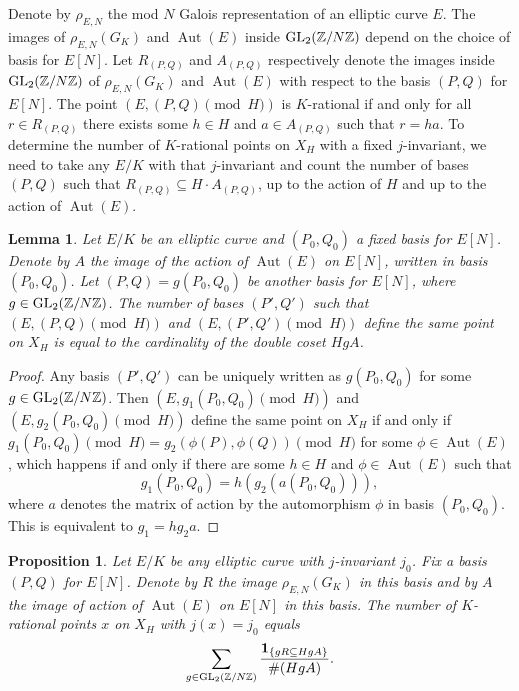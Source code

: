 \documentclass[10pt,leqno]{amsart}
\newcommand{\Z}{\mathbb{Z}}
\newcommand{\GL}{\textnormal{GL}}
\DeclareMathOperator{\Aut}{Aut}
\newtheorem{lemma}[theorem]{Lemma}
\newtheorem{proposition}[theorem]{Proposition}
\theoremstyle{definition}
\theoremstyle{remark}
\numberwithin{theorem}{section}
\begin{document}
Denote by $\rho_{E,N}$ the mod $N$ Galois representation of an elliptic curve $E$. The images of $\rho_{E,N}(G_K)$ and $\Aut(E)$ inside $\GL_2(\Z/N\Z)$ depend on the choice of basis for $E[N]$. Let $R_{(P,Q)}$ and $A_{(P,Q)}$ respectively denote the images inside $\GL_2(\Z/N\Z)$ of $\rho_{E,N}(G_K)$ and $\Aut(E)$ with respect to the basis $(P,Q)$ for $E[N]$. The point $(E, (P,Q) \pmod H)$ is $K$-rational if and only for all $r \in R_{(P,Q)}$ there exists some $h\in H$ and $a \in A_{(P,Q)}$ such that $r=ha$. To determine the number of $K$-rational points on $X_H$ with a fixed $j$-invariant, we need to take any $E/K$ with that $j$-invariant and count the number of bases $(P,Q)$ such that $R_{(P,Q)}\subseteq H\cdot A_{(P,Q)}$, up to the action of $H$ and up to the action of $\Aut(E)$. 

\begin{lemma}\label{broj baza}
    Let $E/K$ be an elliptic curve and $(P_0,Q_0)$ a fixed basis for $E[N]$. Denote by $A$ the image of the action of $\Aut(E)$ on $E[N]$, written in basis $(P_0,Q_0)$. Let $(P,Q)=g(P_0, Q_0)$ be another basis for $E[N]$, where $g \in \GL_2(\Z/N\Z)$. The number of bases $(P', Q')$ such that $(E, (P,Q) \pmod H)$  and $(E, (P', Q') \pmod H)$ define the same point  on $X_H$ is equal to the cardinality of the double coset $HgA$.
\end{lemma}
\begin{proof}
    Any basis $(P', Q')$ can be uniquely written as $g(P_0, Q_0)$ for some $g \in \GL_2(\Z/N\Z)$. Then $(E, g_1(P_0,Q_0) \pmod H)$ and $(E, g_2(P_0, Q_0) \pmod H)$ define the same point on $X_H$ if and only if $g_1(P_0, Q_0) \pmod H=g_2(\phi(P), \phi(Q)) \pmod H$ for some $\phi \in \Aut(E)$, which happens if and only if there are some $h \in H$ and $\phi \in \Aut(E)$ such that $$g_1(P_0,Q_0)=h(g_2(a(P_0, Q_0))),$$ where $a$ denotes the matrix of action by the automorphism $\phi$ in basis $(P_0,Q_0)$. This is equivalent to $g_1=hg_2a$.
\end{proof}

\begin{proposition}
    Let $E/K$ be any elliptic curve with $j$-invariant $j_0$. Fix a basis $(P,Q)$ for $E[N]$. Denote by $R$ the image $\rho_{E,N}(G_K)$ in this basis and by $A$ the image of action of $\Aut(E)$ on $E[N]$ in this basis. The number of $K$-rational points $x$ on $X_H$ with $j(x)=j_0$ equals $$\sum_{g \in \GL_2(\Z/N\Z)} \frac{\mathbf{1}_{\{gR \subseteq HgA\}}}{\#(HgA)}.$$
\end{proposition}
\end{document}
